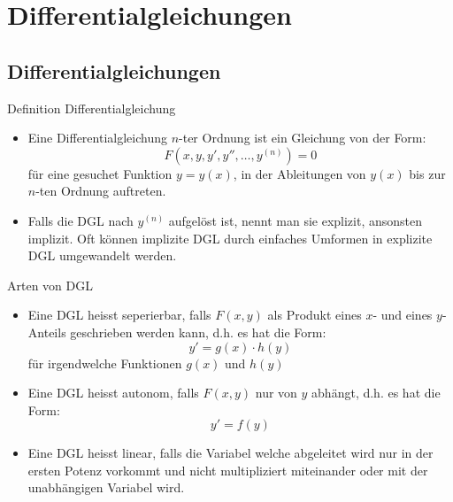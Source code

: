 \section{Differentialgleichungen}
\subsection{Differentialgleichungen}
\begin{definition}{Definition Differentialgleichung}\\
  \begin{itemize}
    \item Eine Differentialgleichung \(n\)-ter Ordnung ist ein Gleichung von der Form:
      \[F(x,y,y',y'',\ldots,y^{(n)})=0\]
      für eine gesuchet Funktion \(y=y(x)\), in der Ableitungen von \(y(x)\) bis zur \(n\)-ten Ordnung auftreten.
    \item Falls die DGL nach \(y^{(n)}\) aufgelöst ist, nennt man sie explizit, ansonsten implizit.
      Oft können implizite DGL durch einfaches Umformen in explizite DGL umgewandelt werden.
  \end{itemize}
\end{definition}
\begin{definition}{Arten von DGL}\\
  \begin{itemize}
    \item Eine DGL heisst seperierbar, falls \(F(x,y)\) als Produkt eines \(x\)- und eines \(y\)-Anteils geschrieben
      werden kann, d.h. es hat die Form:
      \[y'=g(x)\cdot h(y)\]
      für irgendwelche Funktionen \(g(x)\) und \(h(y)\)
    \item Eine DGL heisst autonom, falls \(F(x,y)\) nur von \(y\) abhängt, d.h. es hat die Form:
      \[y'=f(y)\]
    \item Eine DGL heisst linear, falls die Variabel welche abgeleitet wird nur in der ersten Potenz vorkommt und nicht
      multipliziert miteinander oder mit der unabhängigen Variabel wird.
  \end{itemize}
\end{definition}

